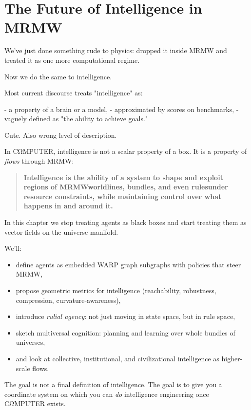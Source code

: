 \chapter{The Future of Intelligence in MRMW}
\label{sec:future-intelligence-mrmw}

We’ve just done something rude to physics: dropped it inside MRMW and treated it
as one more computational regime.

Now we do the same to intelligence.

Most current discourse treats "intelligence" as:

- a property of a brain or a model,
- approximated by scores on benchmarks,
- vaguely defined as "the ability to achieve goals."

Cute. Also wrong level of description.

In CΩMPUTER, intelligence is not a scalar property of a box. It is a property of
\emph{flows} through MRMW:

\begin{quote}
\textbf{Intelligence is the ability of a system to shape and exploit regions of MRMW\emd{}worldlines, bundles, and even rules\emd{}under resource constraints, while maintaining control over what happens in and around it.}
\end{quote}

In this chapter we stop treating agents as black boxes and start treating them
as vector fields on the universe manifold.

We’ll:

\begin{itemize}
  \item define agents as embedded WARP graph subgraphs with policies that steer MRMW,
  \item propose geometric metrics for intelligence (reachability, robustness, compression, curvature-awareness),
  \item introduce \emph{rulial agency}: not just moving in state space, but in rule space,
  \item sketch multiversal cognition: planning and learning over whole bundles of universes,
  \item and look at collective, institutional, and civilizational intelligence as higher-scale flows.
\end{itemize}

The goal is not a final definition of intelligence. The goal is to give you a
coordinate system on which you can \emph{do} intelligence engineering once
CΩMPUTER exists.

